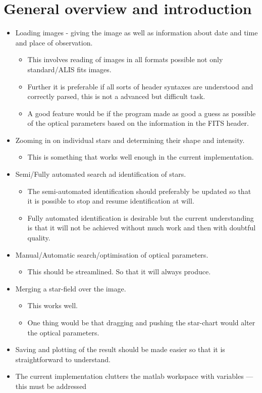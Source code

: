 \documentclass[amstex,psfig]{article}
\begin{document}
\section{General overview and introduction}
\label{sec:gener-overv-intr}

\begin{itemize}
\item
  Loading images - giving the image as well as information about
  date and time and place of observation.
  \begin{itemize}
  \item This involves reading of images in all formats possible not
    only standard/ALIS fits images.
  \item Further it is preferable if all sorts of header syntaxes are
    understood and correctly parsed, this is not a advanced but
    difficult task.
  \item A good feature would be if the program made as good a guess as
    possible of the optical parameters based on the information in the
    FITS header.
  \end{itemize}
\item Zooming in on individual stars and determining their shape and
  intensity.
  \begin{itemize}
  \item This is something that works well enough in the current
    implementation.
  \end{itemize}
\item Semi/Fully automated search ad identification of stars.
  \begin{itemize}
  \item The semi-automated identification should preferably be updated
    so that it is possible to stop and resume identification at will.
  \item Fully automated identification is desirable but the current
    understanding is that it will not be achieved without much work
    and then with doubtful quality.
  \end{itemize}
\item Manual/Automatic search/optimisation of optical parameters.
  \begin{itemize}
  \item This should be streamlined. So that it will always produce.
  \end{itemize}
\item Merging a star-field over the image.
  \begin{itemize}
  \item This works well. 
  \item One thing would be that dragging and pushing the star-chart
    would alter the optical parameters.
  \end{itemize}
\item Saving and plotting of the result should be made easier so that
  it is straightforward to understand.
\item The current implementation clutters the matlab workspace with
  variables --- this must be addressed
\end{itemize}
\end{document}
